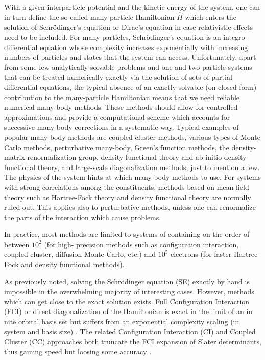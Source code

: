 \documentclass[twoside,english]{uiofysmaster}
\begin{document}
With a given interparticle potential and the kinetic energy of the
system, one can in turn define the so-called many-particle Hamiltonian
$\hat{H}$ which enters the solution of Schr\"odinger's equation or
Dirac's equation in case relativistic effects need to be included.
For many particles, Schr\"odinger's equation is an
integro-differential equation whose complexity increases exponentially
with increasing numbers of particles and states that the system can
access.  Unfortunately, apart from some few analytically solvable
problems and one and two-particle systems that can be treated
numerically exactly via the solution of sets of partial differential
equations, the typical absence of an exactly solvable (on closed form)
contribution to the many-particle Hamiltonian means that we need
reliable numerical many-body methods.  These methods should allow for
controlled approximations and provide a computational scheme which
accounts for successive many-body corrections in a systematic way.
Typical examples of popular many-body methods are coupled-cluster
methods, various types of Monte Carlo methods, perturbative many-body,
Green's function methods, the density-matrix renormalization group,
density functional theory and ab initio density functional theory, and
large-scale diagonalization methods, just to mention a few.  The
physics of the system hints at which many-body methods to use. For
systems with strong correlations among the constituents, methods based
on mean-field theory such as Hartree-Fock theory and density
functional theory are normally ruled out.  This applies also to
perturbative methods, unless one can renormalize the parts of the
interaction which cause problems.

In practice, most methods are limited to systems of containing on the
order of between $10^2$ (for high- precision methods such as 
configuration interaction, coupled cluster, diffusion Monte Carlo, etc.) and
$10^5$ electrons (for faster Hartree-Fock and density functional
methods).

As previously noted, solving the Schr\"odinger equation (SE) exactly
by hand is impossible in the overwhelming majority of interesting
cases. However, methods which can get close to the exact solution
exists. Full Configuration Interaction (FCI) or direct diagonalization
of the Hamiltonian is exact in the limit of an in nite orbital basis
set but suffers from an exponential complexity scaling (in system and
basis size) \cite{Helgaker2000}.  The related Configuration Interaction
(CI) and Coupled Cluster (CC) approaches both truncate the FCI
expansion of Slater determinants, thus gaining speed but loosing some
accuracy \cite{Kvaal2017,Hammond1994}.
\end{document}
